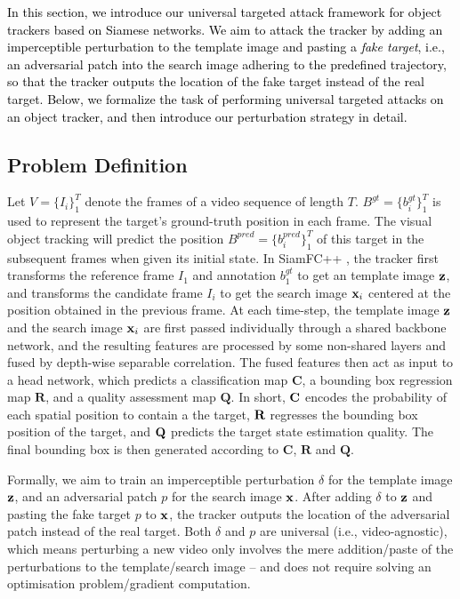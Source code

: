 \documentclass{article}
\begin{document}
\textcolor{black}{In this section, we introduce our universal targeted attack framework for object trackers based on Siamese networks. We aim to attack the tracker by adding an imperceptible perturbation to the template image and pasting a \textit{fake target}, i.e., an adversarial patch into the search image adhering to the predefined trajectory, so that the tracker outputs the location of the fake target instead of the real target. Below, we formalize the task of performing universal targeted attacks on an object tracker, and then introduce our perturbation strategy in detail.}
 
\subsection{Problem Definition}

Let $V=\{I_i\}_1^T$ denote the frames of a video sequence of length $T$.
$B^{gt}=\{b^{gt}_i\}_1^T$ is used to represent the target's ground-truth position in each frame.
The visual object tracking will predict the position $B^{pred}=\{b^{pred}_i\}_1^T$ of this target in the subsequent frames when given its initial state.
In SiamFC++ \cite{SiamFC++}, the tracker first transforms the reference frame $I_1$ and annotation $b_1^{gt}$ to get an template image $\textbf z$, and transforms the candidate frame $I_i$ to get the search image $\textbf x_i$ centered at the position obtained in the previous frame.
At each time-step, the template image $\textbf z$ and the search image $\textbf x_i$ are first passed individually through a shared backbone network, and the resulting features are processed by some non-shared layers and fused by depth-wise separable correlation. The fused features then act as input to a head network, which predicts a classification map $\textbf{C}$, a bounding box regression map $\textbf{R}$, and a quality assessment map $\textbf{Q}$. In short, $\textbf C$ encodes the probability of each spatial position to contain a the target, $\textbf R$ regresses the bounding box position of the target, and $\textbf Q$ predicts the target state estimation quality. The final bounding box is then generated according to $\textbf{C}$, $\textbf{R}$ and $\textbf{Q}$.

Formally, we aim to train an imperceptible perturbation $\delta$ for the template image $\textbf z$, and an adversarial patch $p$ for the search image $\textbf x$. After adding $\delta$ to $\textbf z$ and pasting the fake target $p$ to $\textbf x$, the tracker outputs the location of the adversarial patch instead of the real target.
Both $\delta$ and $p$ are universal (i.e., video-agnostic), which means perturbing a new video only involves the mere addition/paste of the perturbations to the template/search image -- and does not require solving an optimisation problem/gradient computation.
\end{document}

